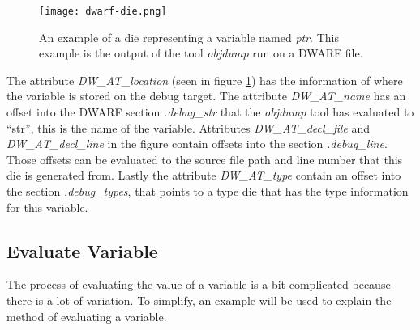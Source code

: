 \begin{figure}[h]
	\centering
	\texttt{[image: dwarf-die.png]}
	\caption{An example of a \gls{die} representing a variable named \emph{ptr}. This example is the output of the tool \emph{objdump} run on a \gls{DWARF} file.}
	\label{fig:dwarfdie}
\end{figure}


The attribute \emph{DW\_AT\_location} (seen in figure \ref{fig:dwarfdie}) has the information of where the variable is stored on the debug target.
The attribute \emph{DW\_AT\_name} has an offset into the \gls{DWARF} section \emph{.debug\_str} that the \emph{objdump} tool has evaluated to ``str'', this is the name of the variable.
Attributes \emph{DW\_AT\_decl\_file} and \emph{DW\_AT\_decl\_line} in the figure contain  offsets into the section \emph{.debug\_line}.
Those offsets can be evaluated to the source file path and line number that this \gls{die} is generated from.
Lastly the attribute \emph{DW\_AT\_type} contain an offset into the section \emph{.debug\_types}, that points to a type \gls{die} that has the type information for this variable.



\subsection{Evaluate Variable}
\label{sec:evaluate-variable}
 


The process of evaluating the value of a variable is a bit complicated because there is a lot of variation.
To simplify, an example will be used to explain the method of evaluating a variable.


